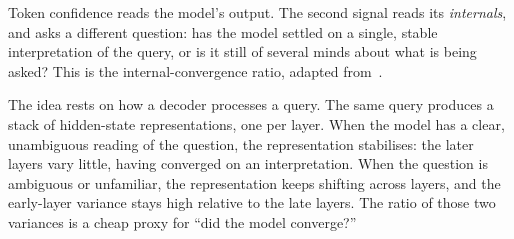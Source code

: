 Token confidence reads the model's output. The second signal reads its
\emph{internals}, and asks a different question: has the model settled on a single,
stable interpretation of the query, or is it still of several minds about what is
being asked? This is the internal-convergence ratio, adapted
from~\cite{nandakishor2025routing}.

The idea rests on how a decoder processes a query. The same query produces a stack
of hidden-state representations, one per layer. When the model has a clear,
unambiguous reading of the question, the representation stabilises: the later
layers vary little, having converged on an interpretation. When the question is
ambiguous or unfamiliar, the representation keeps shifting across layers, and the
early-layer variance stays high relative to the late layers. The ratio of those
two variances is a cheap proxy for ``did the model converge?''

